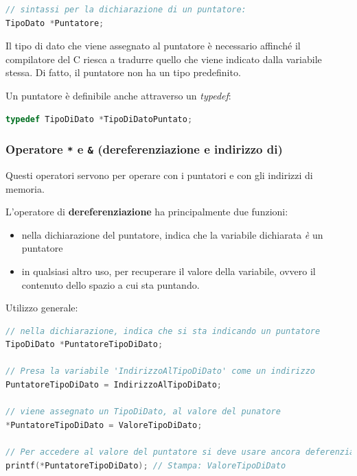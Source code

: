 \documentclass[
  paper=a4,
  oneside  ,captions=tableheading
]{scrbook}
\providecommand{\tightlist}{%
  \setlength{\itemsep}{0pt}\setlength{\parskip}{0pt}}
\begin{document}
\begin{lstlisting}[language=C]
// sintassi per la dichiarazione di un puntatore:
TipoDato *Puntatore;
\end{lstlisting}

Il tipo di dato che viene assegnato al puntatore è necessario affinché
il compilatore del C riesca a tradurre quello che viene indicato dalla
variabile stessa. Di fatto, il puntatore non ha un tipo predefinito.

Un puntatore è definibile anche attraverso un \emph{typedef}:

\begin{lstlisting}[language=C]
typedef TipoDiDato *TipoDiDatoPuntato;
\end{lstlisting}

\hypertarget{operatore-e-dereferenziazione-e-indirizzo-di}{%
\subsubsection{\texorpdfstring{Operatore \texttt{*} e \texttt{\&}
(dereferenziazione e indirizzo
di)}{Operatore * e \& (dereferenziazione e indirizzo di)}}\label{operatore-e-dereferenziazione-e-indirizzo-di}}

Questi operatori servono per operare con i puntatori e con gli indirizzi
di memoria.

L'operatore di \textbf{dereferenziazione} ha principalmente due
funzioni:

\begin{itemize}
\tightlist
\item
  nella dichiarazione del puntatore, indica che la variabile dichiarata
  \emph{è} un puntatore
\item
  in qualsiasi altro uso, per recuperare il valore della variabile,
  ovvero il contenuto dello spazio a cui sta puntando.
\end{itemize}

Utilizzo generale:

\begin{lstlisting}[language=C]
// nella dichiarazione, indica che si sta indicando un puntatore
TipoDiDato *PuntatoreTipoDiDato;

// Presa la variabile 'IndirizzoAlTipoDiDato' come un indirizzo
PuntatoreTipoDiDato = IndirizzoAlTipoDiDato; 

// viene assegnato un TipoDiDato, al valore del punatore
*PuntatoreTipoDiDato = ValoreTipoDiDato; 

// Per accedere al valore del puntatore si deve usare ancora deferenziare:
printf(*PuntatoreTipoDiDato); // Stampa: ValoreTipoDiDato
\end{lstlisting}
\end{document}
